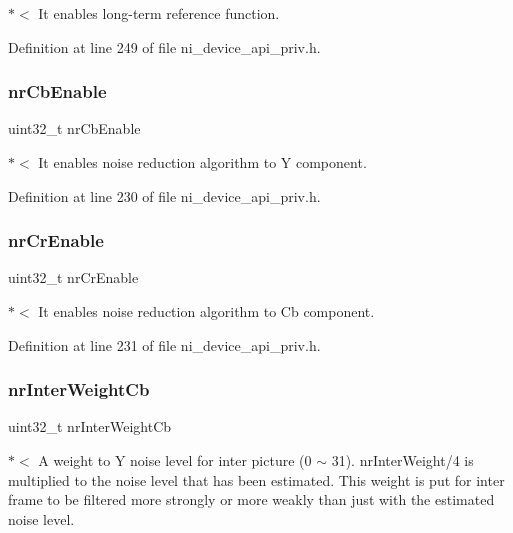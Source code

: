 $\ast$$<$ It enables long-\/term reference function. 

Definition at line 249 of file ni\+\_\+device\+\_\+api\+\_\+priv.\+h.

\mbox{\label{struct__ni__t408__config__t_a556db0011f8c283748d38093092c1563}} 
\subsubsection{\texorpdfstring{nrCbEnable}{nrCbEnable}}
{\footnotesize\ttfamily uint32\+\_\+t nr\+Cb\+Enable}

$\ast$$<$ It enables noise reduction algorithm to Y component. 

Definition at line 230 of file ni\+\_\+device\+\_\+api\+\_\+priv.\+h.

\mbox{\label{struct__ni__t408__config__t_acee109a61abe6ce43c63c7924e42b2da}} 
\subsubsection{\texorpdfstring{nrCrEnable}{nrCrEnable}}
{\footnotesize\ttfamily uint32\+\_\+t nr\+Cr\+Enable}

$\ast$$<$ It enables noise reduction algorithm to Cb component. 

Definition at line 231 of file ni\+\_\+device\+\_\+api\+\_\+priv.\+h.

\mbox{\label{struct__ni__t408__config__t_a82fa586ef2b68c8095f8efac3de9980b}} 
\subsubsection{\texorpdfstring{nrInterWeightCb}{nrInterWeightCb}}
{\footnotesize\ttfamily uint32\+\_\+t nr\+Inter\+Weight\+Cb}

$\ast$$<$ A weight to Y noise level for inter picture (0 $\sim$ 31). nr\+Inter\+Weight/4 is multiplied to the noise level that has been estimated. This weight is put for inter frame to be filtered more strongly or more weakly than just with the estimated noise level. 

